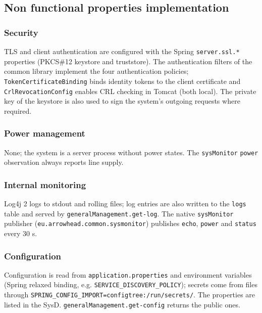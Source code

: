 \documentclass[a4paper]{arrowhead}
\begin{document}
\subsection{Non functional properties implementation}

\subsubsection{Security}

TLS and client authentication are configured with the Spring \texttt{server.ssl.*} properties (PKCS\#12 keystore and truststore). The authentication filters of the common library implement the four authentication policies; \texttt{TokenCertificateBinding} binds identity tokens to the client certificate and \texttt{CrlRevocationConfig} enables CRL checking in Tomcat (both local). The private key of the keystore is also used to sign the system's outgoing requests where required.

\subsubsection{Power management}

None; the system is a server process without power states. The \texttt{sysMonitor} \texttt{power} observation always reports line supply.

\subsubsection{Internal monitoring}

Log4j 2 logs to stdout and rolling files; log entries are also written to the \texttt{logs} table and served by \texttt{generalManagement.get-log}. The native \texttt{sysMonitor} publisher (\texttt{eu.arrowhead.common.sysmonitor}) publishes \texttt{echo}, \texttt{power} and \texttt{status} every 30 s.

\subsubsection{Configuration}

Configuration is read from \texttt{application.properties} and environment variables (Spring relaxed binding, e.g. \texttt{SERVICE\_DISCOVERY\_POLICY}); secrets come from files through \texttt{SPRING\_CONFIG\_IMPORT=configtree:/run/secrets/}. The properties are listed in the SysD. \texttt{generalManagement.get-config} returns the public ones.
\end{document}
